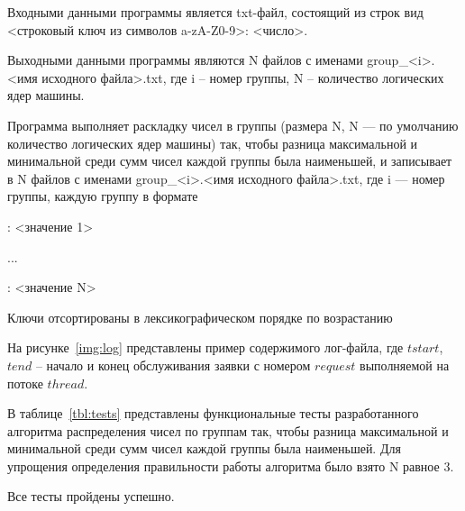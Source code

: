Входными данными программы является txt-файл, состоящий из строк вид <строковый ключ из символов a-zA-Z0-9>: <число>.

Выходными данными программы являются N файлов с именами group\_<i>.<имя исходного файла>.txt, где i -- номер группы, N -- количество логических ядер машины. 
\clearpage

Программа выполняет раскладку чисел в группы (размера N, N — по умолчанию количество логических ядер машины) так, чтобы разница максимальной и минимальной среди сумм чисел каждой группы была наименьшей, и записывает в N файлов с именами group\_<i>.<имя исходного файла>.txt, где i — номер группы, каждую группу в формате

\begin{description}
	\item <сумма чисел группы>
	\item <ключ 1>: <значение 1>
	\item ...
	\item <ключ N>: <значение N>
\end{description}

Ключи отсортированы в лексикографическом порядке по возрастанию
\clearpage


На рисунке~\ref{img:log} представлены пример содержимого лог-файла, где $tstart$, $tend$ -- начало и конец обслуживания заявки с номером $request$ выполняемой на потоке $thread$.

\FloatBarrier

\clearpage
{}

В таблице~\ref{tbl:tests} представлены функциональные тесты разработанного алгоритма распределения чисел по группам так, чтобы разница максимальной и минимальной среди сумм чисел каждой группы была наименьшей. Для упрощения определения правильности работы алгоритма было взято N равное 3. 

Все тесты пройдены успешно.


